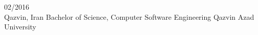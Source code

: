 
\vspace{-10 pt}
\begin{entrylist}
    \entry
    {02/2016 \\ Qazvin, Iran}
    {Bachelor of Science, Computer Software Engineering}
    {Qazvin Azad University}
    { }
\end{entrylist}
